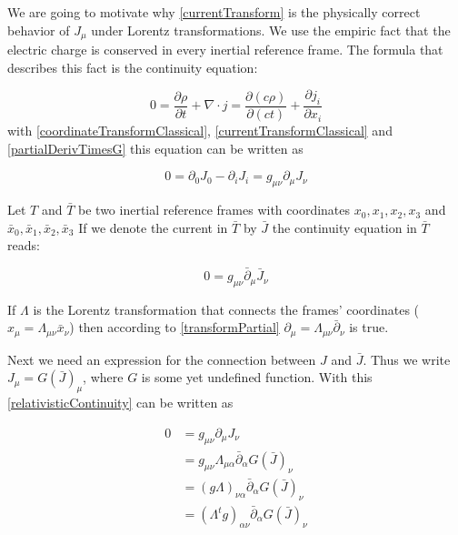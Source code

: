 \documentclass{article}
\begin{document}
We are going to motivate why \ref{currentTransform} is the physically correct behavior of $J_\mu$ under Lorentz transformations.
We use the empiric fact that the electric charge is conserved in every inertial reference frame.
The formula that describes this fact is the continuity equation:

\begin{equation}
    0 = \frac{\partial \rho}{\partial t} + \nabla \cdot j = \frac{\partial (c \rho)}{\partial (ct)} + \frac{\partial j_i}{\partial x_i}
\end{equation}
with \ref{coordinateTransformClassical}, \ref{currentTransformClassical} and \ref{partialDerivTimesG} this equation can be written as

\begin{equation} \label{relativisticContinuity}
    0 = \partial_0 J_0 - \partial_i J_i = g_{\mu\nu} \partial_\mu J_{\nu}
\end{equation}


Let $T$ and $\bar{T}$ be two inertial reference frames with coordinates $x_0, x_1, x_2, x_3$ and $\bar{x}_0, \bar{x}_1, \bar{x}_2, \bar{x}_3$
If we denote the current in $\bar{T}$ by $\bar{J}$ the continuity equation in $\bar{T}$ reads:

\begin{equation} \label{relativisticContinuityTransfored}
    0 = g_{\mu\nu} \bar{\partial}_\mu \bar{J}_{\nu}
\end{equation}

If $\Lambda$ is the Lorentz transformation that connects the frames' coordinates ($x_\mu = \Lambda_{\mu\nu} \bar{x}_\nu$) then according to \ref{transformPartial}
$\partial_\mu = \Lambda_{\mu\nu} \bar{\partial}_\nu$ is true.

Next we need an expression for the connection between $J$ and $\bar{J}$.
Thus we write $J_\mu=G(\bar{J})_\mu$, where $G$ is some yet undefined function.
With this \ref{relativisticContinuity} can be written as

\begin{align} \label{continuityTransformed}
0 & =  g_{\mu\nu} \partial_\mu J_{\nu} \nonumber \\
  & = g_{\mu\nu} \Lambda_{\mu\alpha} \bar{\partial}_\alpha  G(\bar{J})_\nu \nonumber \\
  & = (g \Lambda)_{\nu\alpha} \bar{\partial}_\alpha  G(\bar{J})_\nu \nonumber \\
  & = (\Lambda^t g )_{\alpha\nu} \bar{\partial}_\alpha  G(\bar{J})_\nu \nonumber \\
\end{align}
\end{document}
